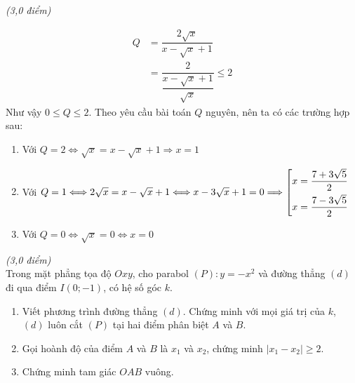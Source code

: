 \begin{ex}{\it{(3,0 điểm)}}
{\begin{align*}
Q&=\dfrac{2\sqrt{x}}{x-\sqrt{x}+1}\\
&=\dfrac{2}{\dfrac{x-\sqrt{x}+1}{\sqrt{x}}}\le 2
\end{align*}
Như vậy $0\le Q\le 2$. Theo yêu cầu bài toán $Q$ nguyên, nên ta có các trường hợp sau:
\begin{enumerate}[+)]
\item Với $Q=2\Longleftrightarrow \sqrt{x}=x-\sqrt{x}+1\Longrightarrow x=1$
\item Với $Q=1\Longleftrightarrow 2\sqrt{x}=x-\sqrt{x}+1\Longleftrightarrow x-3\sqrt{x}+1=0\Longrightarrow \left[\begin{aligned}&x=\dfrac{7+3\sqrt{5}}{2}\\&x=\dfrac{7-3\sqrt{5}}{2}\end{aligned}\right.$
\item Với $Q=0\Longleftrightarrow \sqrt{x}=0\Longleftrightarrow x=0$
\end{enumerate}
}
\end{ex}
\begin{ex}{\it{(3,0 điểm)}}\\
Trong mặt phẳng tọa độ $Oxy$, cho parabol $\left(P\right): y = - x^2$ và đường thẳng $(d)$ đi qua điểm $I\left(0; - 1\right)$, có hệ số góc $k$.
\begin{enumerate}	
	\item Viết phương trình đường thẳng $(d)$. Chứng minh với mọi giá trị của $k$, $(d)$ luôn cắt $\left(P\right)$ tại hai điểm phân biệt $A$ và $B$.
	\item Gọi hoành độ của điểm $A$ và $B$ là $x_1$ và $x_2$, chứng minh $\big\vert x_1 - x_2\big\vert \geq 2$.
	\item  Chứng minh tam giác $OAB$ vuông. 
\end{enumerate}
\end{ex}
